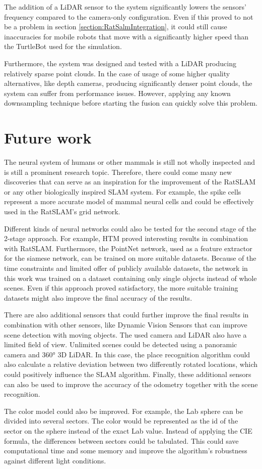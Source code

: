 The addition of a LiDAR sensor to the system significantly lowers the sensors' frequency compared to the camera-only configuration. Even if this proved to not be a problem in section \ref{section:RatSalmIntegration}, it could still cause inaccuracies for mobile robots that move with a significantly higher speed than the TurtleBot used for the simulation.\par
Furthermore, the system was designed and tested with a LiDAR producing relatively sparse point clouds. In the case of usage of some higher quality alternatives, like depth cameras, producing significantly denser point clouds, the system can suffer from performance issues. However, applying any known downsampling technique before starting the fusion can quickly solve this problem.

\section{Future work}

The neural system of humans or other mammals is still not wholly inspected and is still a prominent research topic. Therefore, there could come many new discoveries that can serve as an inspiration for the improvement of the RatSLAM or any other biologically inspired SLAM system. For example, the spike cells \cite{SpikeNN} represent a more accurate model of mammal neural cells and could be effectively used in the RatSLAM's grid network.\par
Different kinds of neural networks could also be tested for the second stage of the 2-stage approach. For example, HTM \cite{HTM} proved interesting results in combination with RatSLAM. Furthermore, the PointNet network, used as a feature extractor for the siamese network, can be trained on more suitable datasets. Because of the time constraints and limited offer of publicly available datasets, the network in this work was trained on a dataset containing only single objects instead of whole scenes. Even if this approach proved satisfactory, the more suitable training datasets might also improve the final accuracy of the results.\par
There are also additional sensors that could further improve the final results in combination with other sensors, like Dynamic Vision Sensors that can improve scene detection with moving objects. The used camera and LiDAR also have a limited field of view. Unlimited scenes could be detected using a panoramic camera and 360° 3D LiDAR. In this case, the place recognition algorithm could also calculate a relative deviation between two differently rotated locations, which could positively influence the SLAM algorithm. Finally, these additional sensors can also be used to improve the accuracy of the odometry together with the scene recognition.\par
The color model could also be improved. For example, the Lab sphere can be divided into several sectors. The color would be represented as the id of the sector on the sphere instead of the exact Lab value. Instead of applying the CIE formula, the differences between sectors could be tabulated. This could save computational time and some memory and improve the algorithm's robustness against different light conditions.
